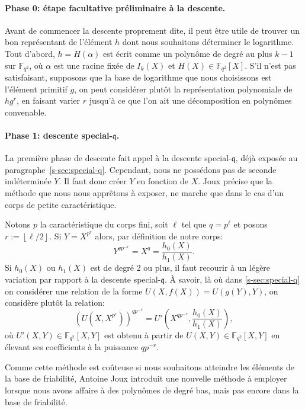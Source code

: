 \documentclass[a4paper, titlepage, 11pt]{article}
\theoremstyle{definition}
\theoremstyle{remark}
\def\gf #1{\mathbb{F}_{#1}}
\def\floor #1{\left\lfloor#1\right\rfloor}
\begin{document}
\paragraph{Phase 0: étape facultative préliminaire à la descente.}Avant de commencer la descente proprement dite, il peut être utile de trouver un bon représentant de l'élément $h$ dont nous souhaitons déterminer le logarithme. Tout d'abord, $h = H(\alpha)$ est écrit comme un polynôme de degré au plus $k-1$ sur $\gf{q^2}$, où $\alpha$ est une racine fixée de $I_k(X)$ et $H(X) \in \gf{q^2}[X]$. S'il n'est pas satisfaisant, supposons que la base de logarithme que nous choisissons est l'élément primitif $g$, on peut considérer plutôt la représentation polynomiale de $hg^r$, en faisant varier $r$ jusqu'à ce que l'on ait une décomposition en polynômes convenable.

\paragraph{Phase 1: descente special-$\mathfrak{q}$.}La première phase de descente fait appel à la descente special-$\mathfrak{q}$, déjà exposée au paragraphe~\ref{s-sec:special-q}. Cependant, nous ne possédons pas de seconde indéterminée $Y$. Il faut donc créer $Y$ en fonction de $X$. Joux \cite{joux2013} précise que la méthode que nous nous apprêtons à exposer, ne marche que dans le cas d'un corps de petite caractéristique.

Notons $p$ la caractéristique du corps fini, soit $\ell$ tel que $q = p^\ell$ et posons $r := \floor{\ell/2}$. Si $Y = X^{p^{r}}$ alors, par définition de notre corps:
$$Y^{qp^{-r}} = X^q = \frac{h_0(X)}{h_1(X)}.$$
Si $h_0(X)$ ou $h_1(X)$ est de degré $2$ ou plus, il faut recourir à un légère variation par rapport à la descente special-$\mathfrak{q}$. À	savoir, là où dans \ref{s-sec:special-q} on considérer une relation de la forme $U(X,f(X)) = U(g(Y),Y)$, on considère plutôt la relation:
$${\left({U(X,X^{p^r})}\right)}^{qp^{-r}} = U'\left( X^{qp^{-r}},\frac{h_0(X)}{h_1(X)}\right),$$
où $U'(X,Y) \in \gf{q^2}[X,Y]$ est obtenu à partir de $U(X,Y)\in \gf{q^2}[X,Y]$ en élevant ses coefficients à la puissance $qp^{-r}$.

Comme cette méthode est coûteuse si nous souhaitons atteindre les éléments de la base de friabilité, Antoine Joux \cite{joux2013} introduit une nouvelle méthode à employer lorsque nous avons affaire à des polynômes de degré bas, mais pas encore dans la base de friabilité.
\end{document}

